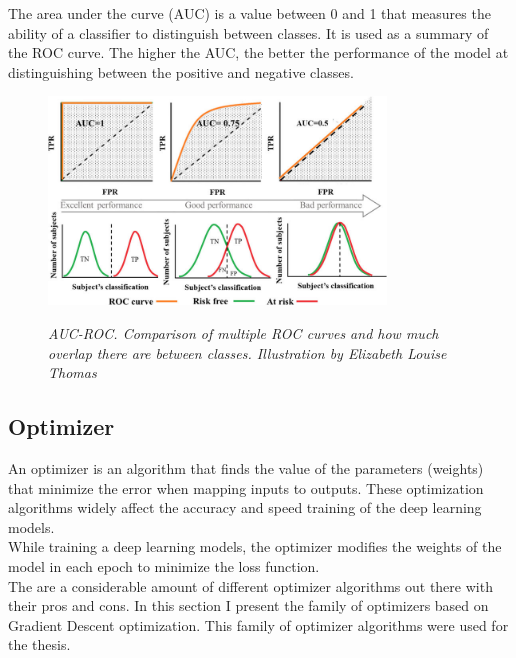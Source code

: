 \begin{itemize}
The area under the curve (AUC) is a value between 0 and 1 that measures
the ability of a classifier to distinguish between classes. It is used as a summary
of the ROC curve. The higher the AUC, the better the performance of the
model at distinguishing between the positive and negative classes.

\begin{figure}[H]
\centering
\includegraphics[width=0.8\textwidth]{imatges/preliminaries/auc.png}
    \caption[Forward Propagation and Backward Propagation]{\textit{AUC-ROC. Comparison of multiple ROC curves and how much overlap there are between classes. Illustration by Elizabeth Louise Thomas}}
{\label{fig:auc-roc}}
\end{figure}

\end{itemize}


\subsection{Optimizer}

An optimizer is an algorithm that finds the value of the parameters (weights) that minimize the error when mapping inputs to outputs. These optimization algorithms widely affect the accuracy and speed training of the deep learning models. \\

While training a deep learning models, the optimizer modifies the weights of the model in each epoch to minimize the loss function. \\

The are a considerable amount of different optimizer algorithms out there with their pros and cons. In this section I present the family of optimizers based on Gradient Descent optimization. This family of optimizer algorithms were used for the thesis. \\

